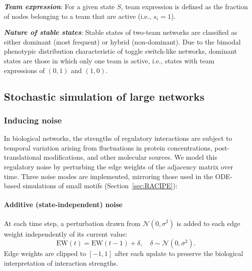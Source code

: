 \documentclass[11pt]{article}
\begin{document}
\noindent\textbf{\textit{Team expression}}\label{text:team_exp}: For a given state $S$, team expression is defined as the fraction of nodes belonging to a team that are active (i.e., $s_i = 1$).


\noindent\textbf{\textit{Nature of stable states}}: Stable states of two-team networks are classified as either dominant (most frequent) or hybrid (non-dominant). Due to the bimodal phenotypic distribution characteristic of toggle switch-like networks, dominant states are those in which only one team is active, i.e., states with team expressions of $(0,1)$ and $(1,0)$.

\subsection{Stochastic simulation of large networks}

\subsubsection{Inducing noise}\label{sssec:noise_def}

In biological networks, the strengths of regulatory interactions are subject to temporal variation arising from fluctuations in protein concentrations, post-translational modifications, and other molecular sources. We model this regulatory noise by perturbing the edge weights of the adjacency matrix over time. Three noise modes are implemented, mirroring those used in the ODE-based simulations of small motifs (Section~\ref{sec:RACIPE}):

\paragraph{Additive (state-independent) noise}
At each time step, a perturbation drawn from $\mathcal{N}(0, \sigma^2)$ is added to each edge weight independently of its current value:
\begin{equation}
    \mathrm{EW}(t) = \mathrm{EW}(t-1) + \delta, \quad \delta \sim \mathcal{N}(0, \sigma^2).
\end{equation}
Edge weights are clipped to $[-1, 1]$ after each update to preserve the biological interpretation of interaction strengths.
\end{document}
